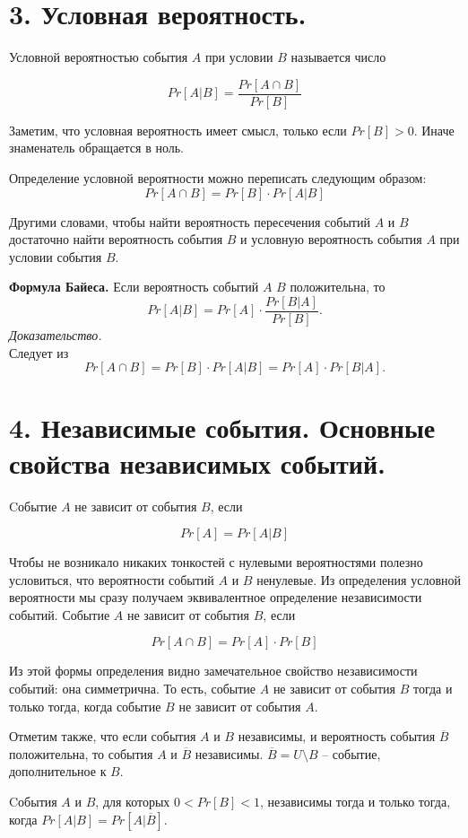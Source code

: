 \section*{3. Условная вероятность.} 
Условной вероятностью события $A$ при условии $B$ называется число

\[
Pr[A|B] = \frac{Pr[A \cap B]}{Pr[B]}
\]

Заметим, что условная вероятность имеет смысл, только если $Pr[B] > 0$. Иначе знаменатель обращается в ноль.

Определение условной вероятности можно переписать следующим образом:
\[
Pr[A \cap B] = Pr[B] \cdot Pr[A|B]
\]

Другими словами, чтобы найти вероятность пересечения событий $A$ и $B$ достаточно найти вероятность события $B$ и условную вероятность события $A$ при условии события $B$.

\textbf{Формула Байеса.} Если вероятность событий $A$  $B$ положительна, то 
\[
	Pr[A|B] = Pr[A] \cdot \frac{Pr[B|A]}{Pr[B]}.
\]
\textit{Доказательство.} \\
Следует из 
\[
	Pr[A \cap B] = Pr[B] \cdot Pr[A|B] = Pr[A] \cdot Pr[B|A].
\]


\section*{4. Независимые события. Основные свойства независимых событий.}

Cобытие $A$ не зависит от события $B$, если

\[
Pr[A] = Pr[A|B]
\]

Чтобы не возникало никаких тонкостей с нулевыми вероятностями полезно условиться, что вероятности событий $A$ и $B$ ненулевые.
Из определения условной вероятности мы сразу получаем эквивалентное определение независимости событий. Событие $A$ не зависит от события $B$, если 

\[
Pr[A \cap B] = Pr[A] \cdot Pr[B]
\]

Из этой формы определения видно замечательное свойство независимости событий: она симметрична. То есть, событие $A$ не зависит от события $B$ тогда и только тогда, когда событие $B$ не зависит от события $A$.

Отметим также, что если события $A$ и $B$ независимы, и вероятность события $\overline{B}$ положительна, то события $A$ и $\overline{B}$ независимы. $\overline{B} = U \setminus B$ -- событие, дополнительное к $B$. 

Cобытия $A$ и $B$, для которых $0 < Pr[B] < 1$, независимы тогда и только тогда, когда $Pr[A|B] = Pr[A|\overline{B}].$

